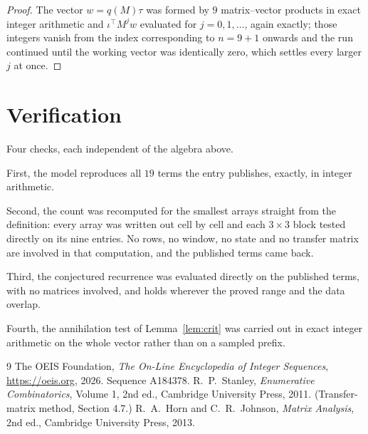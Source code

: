 \documentclass[11pt,a4paper]{article}
\theoremstyle{plain}
\theoremstyle{definition}
\begin{document}
\begin{proof}
The vector $w=q(M)\tau$ was formed by $9$ matrix--vector products in exact integer
arithmetic and $\iota^{\!\top}M^{j}w$ evaluated for $j=0,1,\dots$, again exactly; those
integers vanish from the index corresponding to $n=9+1$ onwards and the run continued
until the working vector was identically zero, which settles every larger $j$ at once.
\end{proof}

\section{Verification}

Four checks, each independent of the algebra above.

First, the model reproduces all $19$ terms the entry publishes, exactly, in integer
arithmetic.

Second, the count was recomputed for the smallest arrays straight from the definition: every
array was written out cell by cell and each $3\times3$ block tested directly on its nine
entries. No rows, no window, no state and no transfer matrix are involved in that computation,
and the published terms came back.

Third, the conjectured recurrence was evaluated directly on the published terms, with no
matrices involved, and holds wherever the proved range and the data overlap.

Fourth, the annihilation test of Lemma~\ref{lem:crit} was carried out in exact integer
arithmetic on the whole vector rather than on a sampled prefix.

\begin{thebibliography}{9}
 The OEIS Foundation, \emph{The On-Line Encyclopedia of Integer
Sequences}, \url{https://oeis.org}, 2026. Sequence A184378.
 R.~P.~Stanley, \emph{Enumerative Combinatorics}, Volume 1, 2nd ed.,
Cambridge University Press, 2011. (Transfer-matrix method, Section 4.7.)
 R.~A.~Horn and C.~R.~Johnson, \emph{Matrix Analysis}, 2nd ed., Cambridge
University Press, 2013.
\end{thebibliography}
\end{document}
